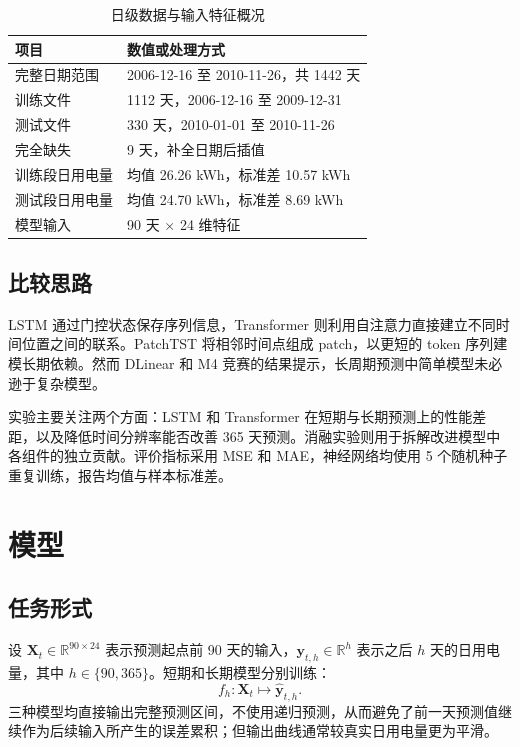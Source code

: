 \documentclass[11pt,a4paper]{article}
\begin{document}
\begin{table}[H]
\centering
\caption{日级数据与输入特征概况}
\label{tab:data}
\begin{tabular}{ll}
\toprule
项目 & 数值或处理方式 \\
\midrule
完整日期范围 & 2006-12-16 至 2010-11-26，共 1442 天 \\
训练文件 & 1112 天，2006-12-16 至 2009-12-31 \\
测试文件 & 330 天，2010-01-01 至 2010-11-26 \\
完全缺失 & 9 天，补全日期后插值 \\
训练段日用电量 & 均值 26.26 kWh，标准差 10.57 kWh \\
测试段日用电量 & 均值 24.70 kWh，标准差 8.69 kWh \\
模型输入 & 90 天 $\times$ 24 维特征 \\
\bottomrule
\end{tabular}
\end{table}

\subsection{比较思路}

LSTM 通过门控状态保存序列信息\cite{lstm}，Transformer 则利用自注意力直接建立不同时间位置之间的联系\cite{transformer}。PatchTST 将相邻时间点组成 patch，以更短的 token 序列建模长期依赖\cite{patchtst}。然而 DLinear 和 M4 竞赛的结果提示，长周期预测中简单模型未必逊于复杂模型\cite{dlinear,m4}。

实验主要关注两个方面：LSTM 和 Transformer 在短期与长期预测上的性能差距，以及降低时间分辨率能否改善 365 天预测。消融实验则用于拆解改进模型中各组件的独立贡献。评价指标采用 MSE 和 MAE，神经网络均使用 5 个随机种子重复训练，报告均值与样本标准差。

\section{模型}

\subsection{任务形式}

设 $\mathbf{X}_t\in\mathbb{R}^{90\times24}$ 表示预测起点前 90 天的输入，$\mathbf{y}_{t,h}\in\mathbb{R}^{h}$ 表示之后 $h$ 天的日用电量，其中 $h\in\{90,365\}$。短期和长期模型分别训练：
\begin{equation}
f_h:\mathbf{X}_t\mapsto\hat{\mathbf{y}}_{t,h}.
\end{equation}
三种模型均直接输出完整预测区间，不使用递归预测，从而避免了前一天预测值继续作为后续输入所产生的误差累积；但输出曲线通常较真实日用电量更为平滑。
\end{document}
